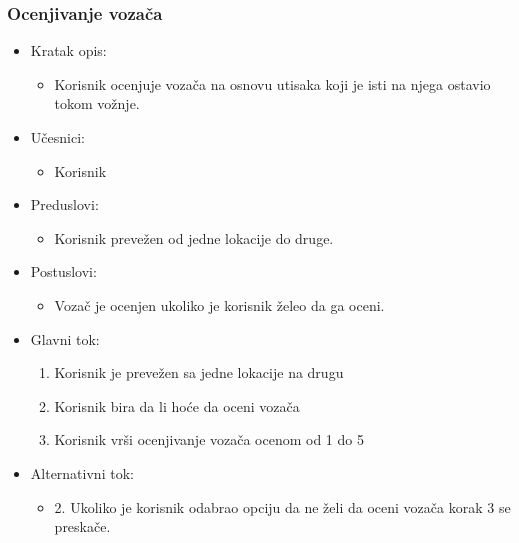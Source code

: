 \subsubsection{\bfseries Ocenjivanje voza\v ca}
\begin{itemize}
	\item Kratak opis:
		\begin{itemize}
			\item Korisnik ocenjuje vozača na osnovu utisaka koji je isti na njega ostavio tokom vožnje.
		\end{itemize}
 
	\item Učesnici:
		\begin{itemize}
			\item Korisnik
		\end{itemize}				

	\item Preduslovi:
		\begin{itemize}
		    \item Korisnik prevežen od jedne lokacije do druge.
		\end{itemize}

	\item Postuslovi:
		\begin{itemize}
			\item Vozač je ocenjen ukoliko je korisnik želeo da ga oceni.
		\end{itemize}		


	\item Glavni tok:
		\begin{enumerate}
		    \item Korisnik je prevežen sa jedne lokacije na drugu
		    \item Korisnik bira da li hoće da oceni vozača
		    \item Korisnik vrši ocenjivanje vozača ocenom od 1 do 5 
		     
		\end{enumerate}

	\item Alternativni tok:
		\begin{itemize}
    		\item 2. Ukoliko je korisnik odabrao opciju da ne želi da oceni vozača korak 3 se preskače.
		\end{itemize}
\end{itemize}

